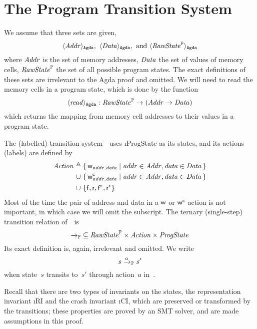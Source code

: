 
\section{The Program Transition System~\Prog}
\label{sec:Prog}

We assume that three sets are given,  
$$ \langle \mathit{Addr} \rangle_\mathtt{Agda},\ \langle \mathit{Data} \rangle_\mathtt{Agda},\ \text{and}\ \langle \mathit{RawState}^{\mathbb P} \rangle_\mathtt{Agda} $$
where $\mathit{Addr}$ is the set of memory addresses, $\mathit{Data}$ the set of values of memory cells, $\mathit{RawState}^{\mathbb P}$ the set of all possible program states.
The exact definitions of these sets are irrelevant to the Agda proof and omitted.
We will need to read the memory cells in a program state, which is done by the function
$$ \langle \mathit{read} \rangle_\mathtt{Agda} : \mathit{RawState}^{\mathbb P} \to (\mathit{Addr} \to \mathit{Data}) $$
which returns the mapping from memory cell addresses to their values in a program state.

The (labelled) transition system~\Prog\ uses \i{ProgState} as its states, and its actions (labels) are defined by%
\begin{align*}
	\mathit{Action} {}\triangleq{}{} &\{\, \mathsf w_{\mathit{addr}, \mathit{data}} \mid \mathit{addr} \in \mathit{Addr}, \mathit{data} \in \mathit{Data} \,\} \\
	\cup \ &\{\, \mathsf w^\mathsf{c}_{\mathit{addr}, \mathit{data}} \mid \mathit{addr} \in \mathit{Addr}, \mathit{data} \in \mathit{Data} \,\}\\
	\cup \ &\{ \mathsf f, \mathsf r, \mathsf{f^c}, \mathsf{r^c} \}
\end{align*}
Most of the time the pair of address and data in a $\mathsf w$ or $\mathsf w^\mathsf{c}$ action is not important, in which case we will omit the subscript.
The ternary (single-step) transition relation of~\Prog\ is
$${\xrightarrow{}_{\mathbb P}} \subseteq \mathit{RawState}^{\mathbb P} \times \mathit{Action} \times \mathit{ProgState}$$
Its exact definition is, again, irrelevant and omitted.
We write
$$s \xrightarrow{a}_{\mathbb P} s'$$
when state~$s$ transits to~$s'$ through action~$a$ in~\Prog.

Recall that there are two types of invariants on the states, the representation invariant \i{RI} and the crash invariant \i{CI}, which are preserved or transformed by the transitions; these properties are proved by an SMT solver, and are made assumptions in this proof.



